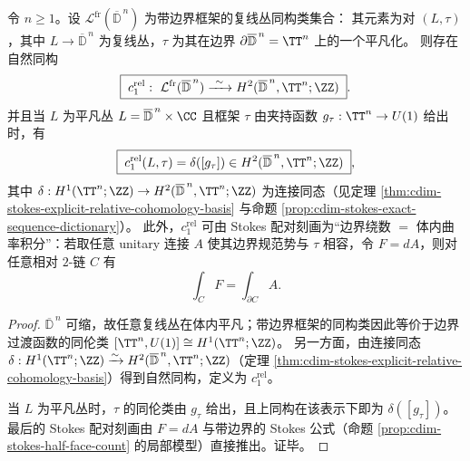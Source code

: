 \begin{theorem}\label{thm:cdim-stokes-relative-c1-framed-line-bundles}
令 \(n\ge 1\)。设 \(\mathcal L^{\mathrm{fr}}(\overline{\mathbb D}^{\,n})\) 为带边界框架的复线丛同构类集合：
其元素为对 \((L,\tau)\)，其中 \(L\to \overline{\mathbb D}^{\,n}\) 为复线丛，\(\tau\) 为其在边界 \(\partial\overline{\mathbb D}^{\,n}=\TT^{n}\) 上的一个平凡化。
则存在自然同构
\[
\boxed{\;
c_1^{\mathrm{rel}}:\ \mathcal L^{\mathrm{fr}}(\overline{\mathbb D}^{\,n})\xrightarrow{\ \sim\ }H^{2}(\overline{\mathbb D}^{\,n},\TT^{n};\ZZ)\; } .
\]
并且当 \(L\) 为平凡丛 \(L=\overline{\mathbb D}^{\,n}\times\CC\) 且框架 \(\tau\) 由夹持函数 \(g_\tau:\TT^{n}\to U(1)\) 给出时，有
\[
\boxed{\;
c_1^{\mathrm{rel}}(L,\tau)=\delta([g_\tau])\in H^{2}(\overline{\mathbb D}^{\,n},\TT^{n};\ZZ)\; } ,
\]
其中 \(\delta:H^{1}(\TT^{n};\ZZ)\to H^{2}(\overline{\mathbb D}^{\,n},\TT^{n};\ZZ)\) 为连接同态（见定理 \ref{thm:cdim-stokes-explicit-relative-cohomology-basis} 与命题 \ref{prop:cdim-stokes-exact-sequence-dictionary}）。
此外，\(c_1^{\mathrm{rel}}\) 可由 Stokes 配对刻画为“边界绕数 \(=\) 体内曲率积分”：若取任意 unitary 连接 \(A\) 使其边界规范势与 \(\tau\) 相容，令 \(F=dA\)，则对任意相对 \(2\)-链 \(C\) 有
\[
\int_{C}F=\int_{\partial C}A.
\]
\end{theorem}
\begin{proof}
\(\overline{\mathbb D}^{\,n}\) 可缩，故任意复线丛在体内平凡；带边界框架的同构类因此等价于边界过渡函数的同伦类
\(
[\TT^{n},U(1)]\cong H^{1}(\TT^{n};\ZZ)
\)。
另一方面，由连接同态 \(\delta:H^{1}(\TT^{n};\ZZ)\xrightarrow{\sim}H^{2}(\overline{\mathbb D}^{\,n},\TT^{n};\ZZ)\)（定理 \ref{thm:cdim-stokes-explicit-relative-cohomology-basis}）得到自然同构，定义为 \(c_1^{\mathrm{rel}}\)。
\par
当 \(L\) 为平凡丛时，\(\tau\) 的同伦类由 \(g_\tau\) 给出，且上同构在该表示下即为 \(\delta([g_\tau])\)。
最后的 Stokes 配对刻画由 \(F=dA\) 与带边界的 Stokes 公式（命题 \ref{prop:cdim-stokes-half-face-count} 的局部模型）直接推出。证毕。
\end{proof}

